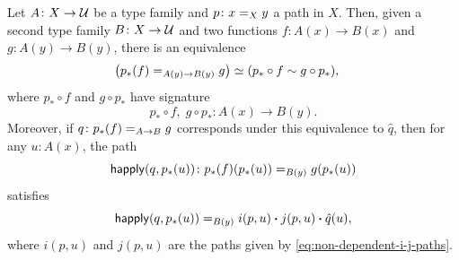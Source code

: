 \begin{thm}\fe\label{thm:function-equality-equivalence}
    Let\/ $A\colon X\to\univ$ be a type family and\/ $p\colon x\eq Xy$ a path in $X$. Then, given a second type family $B\colon X\to\univ$ and two functions\/ $f\colon A(x)\to B(x)$ and\/ $g\colon A(y)\to B(y)$, there is an equivalence
    \begin{align*}
        \bigl(p_*(f)\mathrel{=_{A(y)\to B(y)}}g\bigr)
            &\simeq(p_*\circ f\sim g\circ p_*),
    \end{align*}
    where $p_*\circ f$ and $g\circ p_*$ have signature
    \[
        p_*\circ f,\;g\circ p_*\colon A(x)\to B(y).
    \]
    Moreover, if\/ $q\colon p_*(f)\eq{A\to B}g$ corresponds under this equivalence to\/ $\hat q$, then for any\/ $u\colon A(x)$, the path
    \[
        \fun{happly}(q,p_*(u))
            \colon p_*(f)(p_*(u))\eq{B(y)}g(p_*(u))
    \]
    satisfies
    \[
        \mathsf{happly}(q,p_*(u))
        \mathrel{=_{B(y)}}
        i(p,u)\mathbin{\boldsymbol{\cdot}} j(p,u)\mathbin{\boldsymbol{\cdot}}\hat q(u),
    \]
    where\/ $i(p,u)$ and\/ $j(p,u)$ are the paths given by\/ \eqref{eq:non-dependent-i-j-paths}.
\end{thm}

